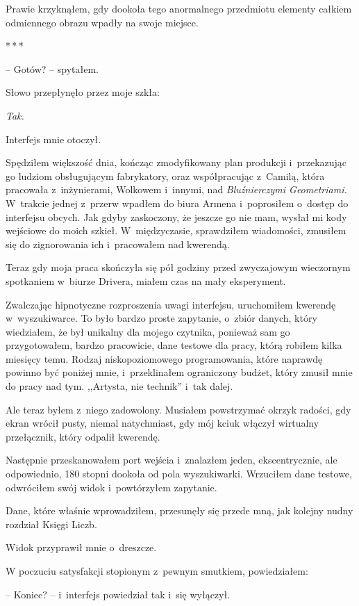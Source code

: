 \documentclass[oneside,polish,12pt,sfheadings]{mwbk}
\newcommand{\threeast}{\bigskip\par\centerline{*\,*\,*}\medskip\par}%
\begin{document}
Prawie krzyknąłem, gdy dookoła tego anormalnego przedmiotu elementy
całkiem odmiennego obrazu wpadły na swoje miejsce.

\threeast

-- Gotów? -- spytałem.

Słowo przepłynęło przez moje szkła:

\emph{Tak.}

Interfejs mnie otoczył.

Spędziłem większość dnia, kończąc zmodyfikowany plan produkcji i~przekazując go ludziom obsługującym fabrykatory, oraz współpracując z~Camilą, która pracowała z~inżynierami, Wolkowem i~innymi, nad
\emph{Bluźnierczymi Geometriami. } W~trakcie jednej z~przerw wpadłem do
biura Armena i~poprosiłem o~dostęp do interfejsu obcych. Jak gdyby
zaskoczony, że jeszcze go nie mam, wysłał mi kody wejściowe do moich
szkieł. W~międzyczasie, sprawdziłem wiadomości, zmusiłem się do
zignorowania ich i~pracowałem nad kwerendą.

Teraz gdy moja praca skończyła się pół godziny przed zwyczajowym
wieczornym spotkaniem w~biurze Drivera, miałem czas na mały eksperyment.

Zwalczając hipnotyczne rozproszenia uwagi interfejsu, uruchomiłem
kwerendę w~wyszukiwarce. To było bardzo proste zapytanie, o~zbiór
danych, który wiedziałem, że był unikalny dla mojego czytnika, ponieważ
sam go przygotowałem, bardzo pracowicie, dane testowe dla pracy, którą
robiłem kilka miesięcy temu. Rodzaj niskopoziomowego programowania,
które naprawdę powinno być poniżej mnie, i~przeklinałem ograniczony
budżet, który zmusił mnie do pracy nad tym. ,,Artysta, nie technik'' i~tak
dalej.

Ale teraz byłem z~niego zadowolony. Musiałem powstrzymać okrzyk radości,
gdy ekran wrócił pusty, niemal natychmiast, gdy mój kciuk włączył
wirtualny przełącznik, który odpalił kwerendę.

Następnie przeskanowałem port wejścia i~znalazłem jeden, ekscentrycznie,
ale odpowiednio, 180 stopni dookoła od pola wyszukiwarki. Wrzuciłem dane
testowe, odwróciłem swój widok i~powtórzyłem zapytanie.

Dane, które właśnie wprowadziłem, przesunęły się przede mną, jak kolejny
nudny rozdział Księgi Liczb.

Widok przyprawił mnie o~dreszcze.

W poczuciu satysfakcji stopionym z~pewnym smutkiem, powiedziałem: 

-- Koniec? -- i~interfejs powiedział tak i~się wyłączył.
\end{document}
